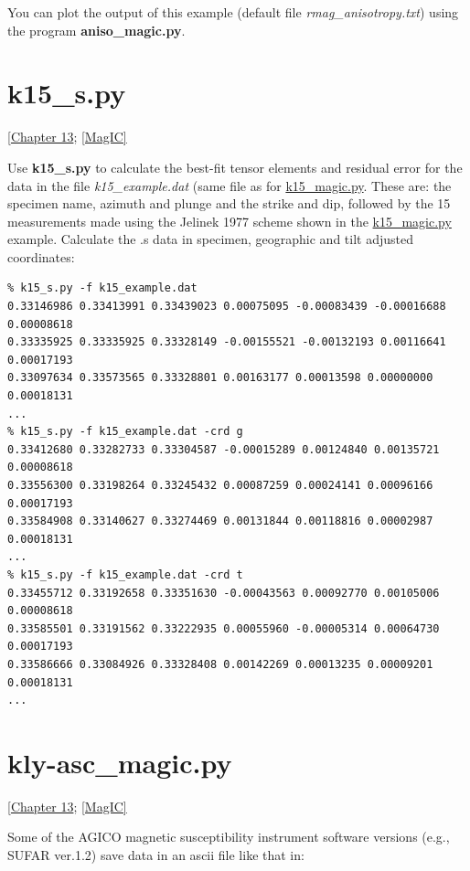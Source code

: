 \documentclass[11pt]{book}
\begin{document}
{{{{You can plot the output of this example (default file {\it rmag\_anisotropy.txt}) using the program {\bf aniso\_magic.py}.     

\section {\bf k15\_s.py}  
[\href{http://magician.ucsd.edu/Essentials/WebBook2.html#Paleomagnetic_tensors}{Chapter 13}; 
\href{#MagIC}{[MagIC]}

%
Use {\bf k15\_s.py} to calculate the best-fit tensor elements and residual error for the data in the file {\it k15\_example.dat} (same file as for \href{#k15_magic.py}{k15_magic.py}.  These are: the specimen name, azimuth and plunge and the strike and dip, followed by the 15 measurements made using the Jelinek 1977 \nocite{jelinek77} scheme shown in the \href{#k15_magic.py}{k15_magic.py} example.  Calculate the .s data in specimen, geographic  and tilt adjusted coordinates:

\begin{verbatim}
% k15_s.py -f k15_example.dat
0.33146986 0.33413991 0.33439023 0.00075095 -0.00083439 -0.00016688 0.00008618
0.33335925 0.33335925 0.33328149 -0.00155521 -0.00132193 0.00116641 0.00017193
0.33097634 0.33573565 0.33328801 0.00163177 0.00013598 0.00000000 0.00018131
...
% k15_s.py -f k15_example.dat -crd g
0.33412680 0.33282733 0.33304587 -0.00015289 0.00124840 0.00135721 0.00008618
0.33556300 0.33198264 0.33245432 0.00087259 0.00024141 0.00096166 0.00017193
0.33584908 0.33140627 0.33274469 0.00131844 0.00118816 0.00002987 0.00018131
...
% k15_s.py -f k15_example.dat -crd t
0.33455712 0.33192658 0.33351630 -0.00043563 0.00092770 0.00105006 0.00008618
0.33585501 0.33191562 0.33222935 0.00055960 -0.00005314 0.00064730 0.00017193
0.33586666 0.33084926 0.33328408 0.00142269 0.00013235 0.00009201 0.00018131
...
\end{verbatim}

%

\section {\bf kly-asc\_magic.py} 
[\href{http://magician.ucsd.edu/Essentials/WebBook2.html#Paleomagnetic_tensors}{Chapter 13}; 
\href{#MagIC}{[MagIC]}


Some of the AGICO  magnetic susceptibility instrument software versions (e.g., SUFAR ver.1.2)  save data in an ascii file like that in:

}}}}
\end{document}
